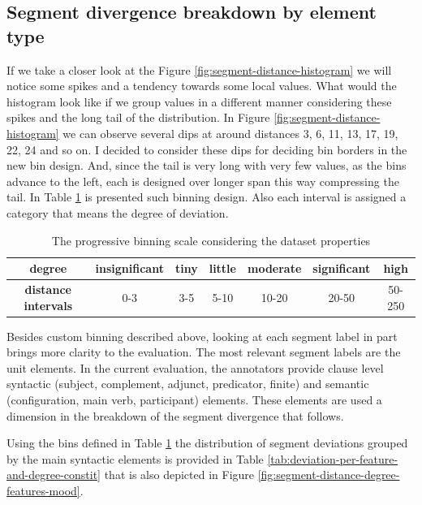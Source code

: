 \subsection{Segment divergence breakdown by element type}

If we take a closer look at the Figure \ref{fig:segment-distance-histogram} we will notice some spikes and a tendency towards some local values. What would the histogram look like if we group values in a different manner considering these spikes and the long tail of the distribution. 
In Figure \ref{fig:segment-distance-histogram} we can observe several dips at around distances 3, 6, 11, 13, 17, 19, 22, 24 and so on. I decided to consider these dips for deciding bin borders in the new bin design. And, since the tail is very long with very few values, as the bins advance to the left, each is designed over longer span this way compressing the tail. In Table \ref{tab:progressive-bins} is presented such binning design. Also each interval is assigned a category that means the degree of deviation.

\begin{table}[!ht]
    \begin{tabular}{|c|c|c|c|c|c|c|}
        \hline
        \textbf{degree}          & insignificant & tiny & little & moderate & significant & high   \\ \hline
        \textbf{distance intervals} & 0-3           & 3-5  & 5-10   & 10-20    & 20-50       & 50-250 \\ \hline
    \end{tabular}
    \caption{The progressive binning scale considering the dataset properties}
    \label{tab:progressive-bins}
\end{table}

Besides custom binning described above, looking at each segment label in part brings more clarity to the evaluation. The most relevant segment labels are the unit elements. In the current evaluation, the annotators provide clause level syntactic (subject, complement, adjunct, predicator, finite) and semantic (configuration, main verb, participant) elements. These elements are used a dimension in the breakdown of the segment divergence that follows. 

Using the bins defined in Table \ref{tab:progressive-bins} the distribution of segment deviations grouped by the main syntactic elements is provided in Table \ref{tab:deviation-per-feature-and-degree-constit} that is also depicted in Figure \ref{fig:segment-distance-degree-features-mood}. 


